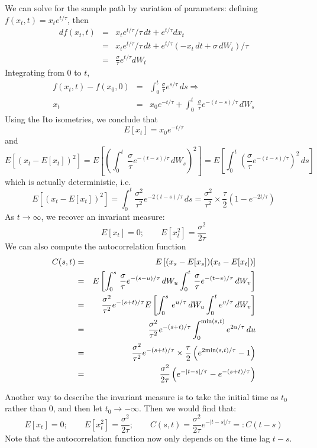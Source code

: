 \documentclass[11pt]{article}
\begin{document}
We can solve for the sample path by variation of parameters: defining $f(x_t,t) = x_t e^{t/\tau}$, then
\begin{eqnarray*}
df(x_t,t) & = & x_t e^{t/\tau} /\tau \, dt + e^{t/\tau} dx_t\\
& = & x_t e^{t/\tau} /\tau \, dt + e^{t/\tau} (- x_t \, dt + \sigma \, dW_t)/\tau\\
& = & \frac{\sigma}{\tau} e^{t/\tau} dW_t
\end{eqnarray*}
Integrating from $0$ to $t$,
\begin{eqnarray*}
f(x_t,t)-f(x_0,0) & = & \int_0^t \frac{\sigma}{\tau} e^{s/\tau} \, ds \Rightarrow\\
x_t & = & x_0 e^{-t/\tau} + \int_0^t \, \frac{\sigma}{\tau} e^{-(t-s)/\tau} \, dW_s
\end{eqnarray*}
Using the Ito isometries, we conclude that 
\[ E[x_t] =  x_0 e^{-t/\tau}\]
and
\[ E[ (x_t - E[x_t])^2] =  E \left[ \left( \int_0^t \, \frac{\sigma}{\tau} e^{-(t-s)/\tau} \, dW_s \right)^2 \right] = E \left[ \int_0^t \left( \frac{\sigma}{\tau} e^{-(t-s)/\tau}  \right)^2 \, ds \right] 
\]
which is actually deterministic, i.e. 
\[ E[ (x_t - E[x_t])^2] = \int_0^t \frac{\sigma^2}{\tau^2} e^{-2(t-s)/\tau}  \, ds = \frac{\sigma^2}{\tau^2} \times \frac{\tau}{2} (1-e^{-2t/\tau})
\]
As $t \rightarrow \infty$, we recover an invariant measure:
\[ E[x_t] = 0; \qquad E[x_t^2]  = \frac{\sigma^2}{2\tau} 
\]
We can also compute the autocorrelation function
\begin{eqnarray*} 
C(s,t) & = & E \left[ (x_s - E[x_s])(x_t - E[x_t]) \right]\\
 &= & E \left[   \int_0^s \, \frac{\sigma}{\tau} e^{-(s-u)/\tau} \, dW_u   \int_0^t \, \frac{\sigma}{\tau} e^{-(t-v)/\tau} \, dW_v \right]\\
 & = & \frac{\sigma^2}{\tau^2} e^{-(s+t)/\tau} E \left[   \int_0^s \, e^{u/\tau} \, dW_u   \int_0^t e^{v/\tau} \, dW_v \right]\\
 & = & \frac{\sigma^2}{\tau^2} e^{-(s+t)/\tau} \int_0^{{\rm min}(s,t)} e^{2u/\tau} \, du \\
  & = & \frac{\sigma^2}{\tau^2} e^{-(s+t)/\tau} \times \frac{\tau}{2} \left( e^{2 {\rm min}(s,t)/\tau} - 1\right) \\
   & = & \frac{\sigma^2}{2 \tau} \left( e^{-|t-s|/\tau} - e^{-(s+t)/\tau} \right)
\end{eqnarray*}

Another way to describe the invariant measure is to take the initial time as $t_0$ rather than $0$, and then let $t_0 \rightarrow -\infty$. Then we would find that:
\[ E[x_t] = 0; \qquad E[x_t^2]  = \frac{\sigma^2}{2\tau}; \qquad C(s,t) = \frac{\sigma^2}{2 \tau}  e^{-|t-s|/\tau} =: C(t-s)
\]
Note that the autocorrelation function now only depends on the time lag $t-s$.
\end{document}
